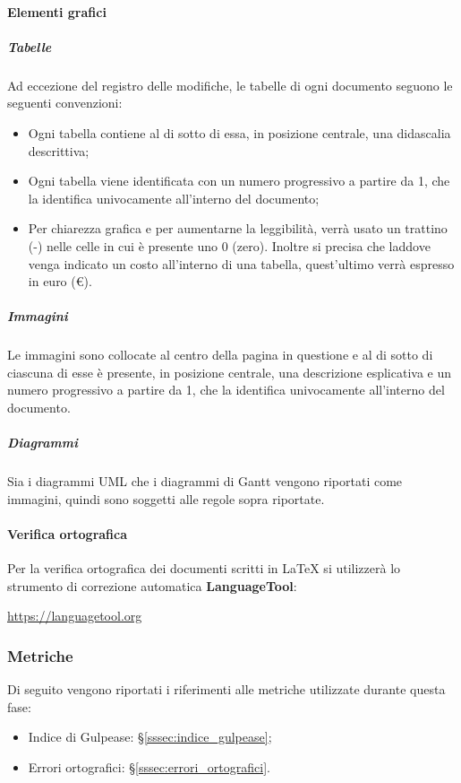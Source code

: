 \paragraph{Elementi grafici}
\subparagraph{Tabelle}
Ad eccezione del registro delle modifiche, le tabelle di ogni documento seguono le seguenti convenzioni:
\begin{itemize}
    \item Ogni tabella contiene al di sotto di essa, in posizione centrale, una didascalia descrittiva;
    \item Ogni tabella viene identificata con un numero progressivo a partire da 1, che la identifica univocamente all'interno del documento;
    \item Per chiarezza grafica e per aumentarne la leggibilità, verrà usato un trattino (-) nelle celle in cui è presente uno 0 (zero). Inoltre si precisa che laddove venga indicato un costo all'interno di una tabella, quest'ultimo verrà espresso in euro (€).
\end{itemize}
\subparagraph{Immagini}
Le immagini sono collocate al centro della pagina in questione e al di sotto di ciascuna di esse è presente, in posizione centrale, una descrizione esplicativa e un numero progressivo a partire da 1, che la identifica univocamente all'interno del documento.
\subparagraph{Diagrammi}
Sia i diagrammi UML\glo{} che i diagrammi di Gantt\glo{} vengono riportati come immagini, quindi sono soggetti alle regole sopra riportate.
\paragraph{Verifica ortografica} \label{verifica_ortografica}
Per la verifica ortografica dei documenti scritti in \LaTeX{} si utilizzerà lo strumento di correzione automatica \textbf{LanguageTool}:
\begin{center}\url{https://languagetool.org}\end{center}


\subsubsection{Metriche}
Di seguito vengono riportati i riferimenti alle metriche utilizzate durante questa fase:
\begin{itemize}
    \item Indice di Gulpease: §\ref{sssec:indice_gulpease};
    \item Errori ortografici: §\ref{sssec:errori_ortografici}.
\end{itemize}    
